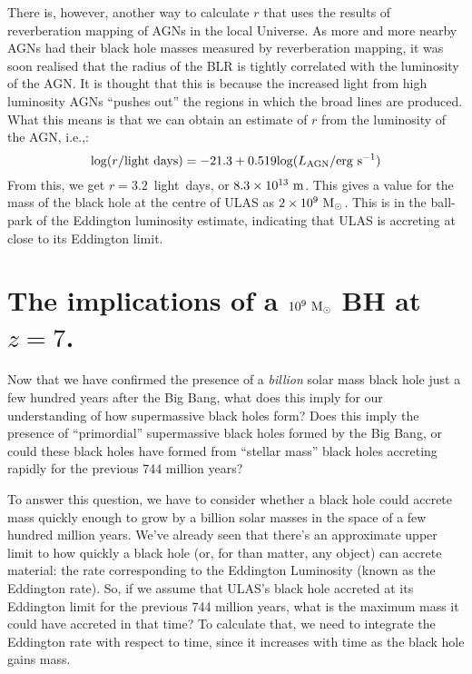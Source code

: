 \documentclass[11pt]{article}
\begin{document}
There is, however, another way to calculate $r$ that uses the results
of reverberation mapping of AGNs in the local Universe. As more and
more nearby AGNs had their black hole masses measured by reverberation
mapping, it was soon realised that the radius of the BLR is tightly
correlated with the luminosity of the AGN. It is thought that this is
because the increased light from high luminosity AGNs ``pushes out''
the regions in which the broad lines are produced. What this means is
that we can obtain an estimate of $r$ from the luminosity of the AGN,
i.e.,:
\begin{equation}
{\rm log}(r/{\rm light~days}) = -21.3 + 0.519{\rm log}(L_{\rm AGN}/{\rm erg~s^{-1}})
\end{equation}
From this, we get $r=3.2$~light~days, or $8.3\times10^{13}~{\rm m}$.
This gives a value for the mass of the black hole at the centre of
ULAS as $2\times10^9~{\rm M_\odot}$. This is in the ball-park of the
Eddington luminosity estimate, indicating that ULAS is accreting at
close to its Eddington limit.

\section{The implications of a $10^9~{\rm M_\odot}$ BH at $z=7$.}
Now that we have confirmed the presence of a {\it billion} solar mass
black hole just a few hundred years after the Big Bang, what does this
imply for our understanding of how supermassive black holes form? Does
this imply the presence of ``primordial'' supermassive black holes
formed by the Big Bang, or could these black holes have formed from
``stellar mass'' black holes accreting rapidly for the previous 744
million years?

To answer this question, we have to consider whether a black hole
could accrete mass quickly enough to grow by a billion solar masses in
the space of a few hundred million years. We've already seen that
there's an approximate upper limit to how quickly a black hole (or,
for than matter, any object) can accrete material: the rate
corresponding to the Eddington Luminosity (known as the Eddington
rate). So, if we assume that ULAS's black hole accreted at its
Eddington limit for the previous 744 million years, what is the
maximum mass it could have accreted in that time? To calculate that,
we need to integrate the Eddington rate with respect to time, since it
increases with time as the black hole gains mass.
\end{document}
